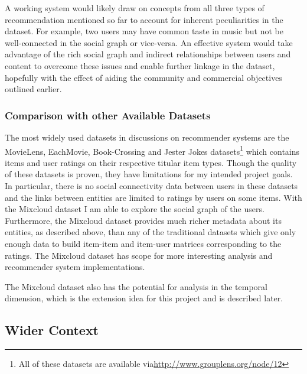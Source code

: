 A working system would likely draw on concepts from all three types of 
recommendation mentioned so far to account for inherent peculiarities in the 
dataset. For example, two users may have common taste in music but not be 
well-connected in the social graph or vice-versa. An effective system would 
take advantage of the rich social graph and indirect relationships between 
users and content to overcome these issues and enable further linkage in the 
dataset, hopefully with the effect of aiding the community and commercial 
objectives outlined earlier.

\subsubsection*{Comparison with other Available Datasets}

The most widely used datasets in discussions on recommender systems are the 
MovieLens, EachMovie, Book-Crossing and Jester Jokes datasets\footnote{
All of these datasets are available via\url{http://www.grouplens.org/node/12}} 
which contains items and user ratings on their respective titular item types. 
Though the quality of these datasets is proven, they have limitations for my 
intended project goals. In particular, there is no social connectivity data 
between users in these datasets and the links between entities are limited to 
ratings by users on some items. With the Mixcloud dataset I am able to explore 
the social graph of the users. Furthermore, the Mixcloud dataset provides much 
richer metadata about its entities, as described above, than any of the 
traditional datasets which give only enough data to build item-item and 
item-user matrices corresponding to the ratings. The Mixcloud dataset has scope 
for more interesting analysis and recommender system implementations.

The Mixcloud dataset also has the potential for analysis in the temporal 
dimension, which is the extension idea for this project and is described later.

\subsection*{Wider Context}

